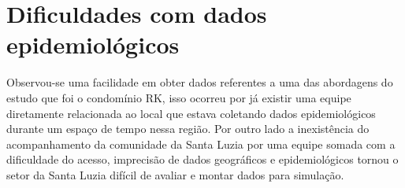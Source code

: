 \section{Dificuldades com dados epidemiológicos}

Observou-se uma facilidade em obter dados referentes a uma das abordagens do estudo que foi o condomínio RK, isso ocorreu por já existir uma equipe diretamente relacionada ao local que estava coletando dados epidemiológicos durante um espaço de tempo nessa região. Por outro lado a inexistência do acompanhamento da comunidade da Santa Luzia por uma equipe somada com a dificuldade do acesso, imprecisão de dados geográficos e epidemiológicos tornou o setor da Santa Luzia difícil de avaliar e montar dados para simulação.





